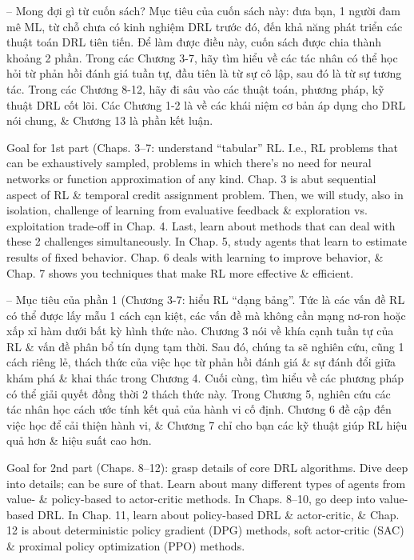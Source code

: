\documentclass{article}
\begin{document}
\begin{itemize}
\begin{itemize}
\begin{itemize}
            -- {\sf Mong đợi gì từ cuốn sách?} Mục tiêu của cuốn sách này: đưa bạn, 1 người đam mê ML, từ chỗ chưa có kinh nghiệm DRL trước đó, đến khả năng phát triển các thuật toán DRL tiên tiến. Để làm được điều này, cuốn sách được chia thành khoảng 2 phần. Trong các Chương 3-7, hãy tìm hiểu về các tác nhân có thể học hỏi từ phản hồi đánh giá tuần tự, đầu tiên là từ sự cô lập, sau đó là từ sự tương tác. Trong các Chương 8-12, hãy đi sâu vào các thuật toán, phương pháp, kỹ thuật DRL cốt lõi. Các Chương 1-2 là về các khái niệm cơ bản áp dụng cho DRL nói chung, \& Chương 13 là phần kết luận.

            Goal for 1st part (Chaps. 3--7: understand ``tabular'' RL. I.e., RL problems that can be exhaustively sampled, problems in which there's no need for neural networks or function approximation of any kind. Chap. 3 is abut sequential aspect of RL \& temporal credit assignment problem. Then, we will study, also in isolation, challenge of learning from evaluative feedback \& exploration vs. exploitation trade-off in Chap. 4. Last, learn about methods that can deal with these 2 challenges simultaneously. In Chap. 5, study agents that learn to estimate results of fixed behavior. Chap. 6 deals with learning to improve behavior, \& Chap. 7 shows you techniques that make RL more effective \& efficient.

            -- Mục tiêu của phần 1 (Chương 3-7: hiểu RL ``dạng bảng''. Tức là các vấn đề RL có thể được lấy mẫu 1 cách cạn kiệt, các vấn đề mà không cần mạng nơ-ron hoặc xấp xỉ hàm dưới bất kỳ hình thức nào. Chương 3 nói về khía cạnh tuần tự của RL \& vấn đề phân bổ tín dụng tạm thời. Sau đó, chúng ta sẽ nghiên cứu, cũng 1 cách riêng lẻ, thách thức của việc học từ phản hồi đánh giá \& sự đánh đổi giữa khám phá \& khai thác trong Chương 4. Cuối cùng, tìm hiểu về các phương pháp có thể giải quyết đồng thời 2 thách thức này. Trong Chương 5, nghiên cứu các tác nhân học cách ước tính kết quả của hành vi cố định. Chương 6 đề cập đến việc học để cải thiện hành vi, \& Chương 7 chỉ cho bạn các kỹ thuật giúp RL hiệu quả hơn \& hiệu suất cao hơn.

            Goal for 2nd part (Chaps. 8--12): grasp details of core DRL algorithms. Dive deep into details; can be sure of that. Learn about many different types of agents from value- \& policy-based to actor-critic methods. In Chaps. 8--10, go deep into value-based DRL. In Chap. 11, learn about policy-based DRL \& actor-critic, \& Chap. 12 is about deterministic policy gradient (DPG) methods, soft actor-critic (SAC) \& proximal policy optimization (PPO) methods.


\end{itemize}
\end{itemize}
\end{itemize}
\end{document}
